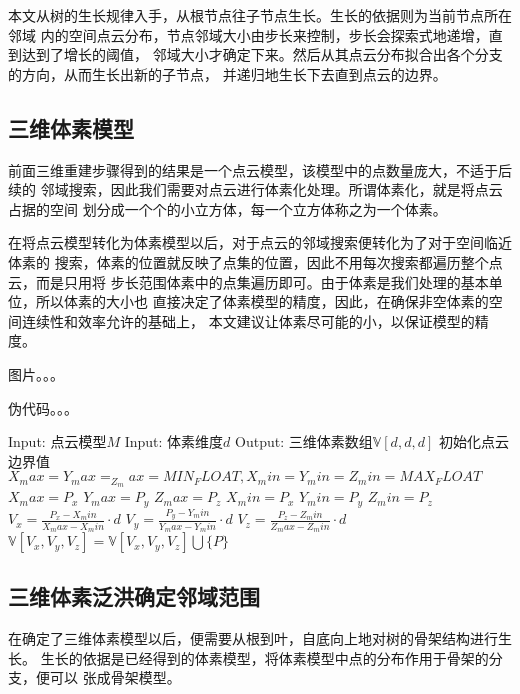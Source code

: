 本文从树的生长规律入手，从根节点往子节点生长。生长的依据则为当前节点所在邻域
内的空间点云分布，节点邻域大小由步长来控制，步长会探索式地递增，直到达到了增长的阈值，
邻域大小才确定下来。然后从其点云分布拟合出各个分支的方向，从而生长出新的子节点，
并递归地生长下去直到点云的边界。

\subsection{三维体素模型}
前面三维重建步骤得到的结果是一个点云模型，该模型中的点数量庞大，不适于后续的
邻域搜索，因此我们需要对点云进行体素化处理。所谓体素化，就是将点云占据的空间
划分成一个个的小立方体，每一个立方体称之为一个体素。

在将点云模型转化为体素模型以后，对于点云的邻域搜索便转化为了对于空间临近体素的
搜索，体素的位置就反映了点集的位置，因此不用每次搜索都遍历整个点云，而是只用将
步长范围体素中的点集遍历即可。由于体素是我们处理的基本单位，所以体素的大小也
直接决定了体素模型的精度，因此，在确保非空体素的空间连续性和效率允许的基础上，
本文建议让体素尽可能的小，以保证模型的精度。

图片。。。

伪代码。。。
\begin{algorithmic}[1]
	\State Input: 点云模型$M$
	\State Input: 体素维度$d$
	\State Output: 三维体素数组$\mathbb{V}[d,d,d]$
	\State 初始化点云边界值$X_max=Y_max=_Z_max=MIN_FLOAT,X_min=Y_min=Z_min=MAX_FLOAT$
		\State $X_max=P_x$
		\EndIf
		\State $Y_max=P_y$
		\EndIf
		\State $Z_max=P_z$
		\EndIf
		\State $X_min=P_x$
		\EndIf
		\State $Y_min=P_y$
		\EndIf
		\State $Z_min=P_z$
		\EndIf
	\EndFor
		\State $V_x = \frac{P_x-X_min}{X_max-X_min}\cdot d$
		\State $V_y = \frac{P_y-Y_min}{Y_max-Y_min}\cdot d$
		\State $V_z = \frac{P_z-Z_min}{Z_max-Z_min}\cdot d$
		\State $\mathbb{V}[V_x, V_y, V_z] = \mathbb{V}[V_x, V_y, V_z] \bigcup \{P\} $
	\EndFor
\end{algorithmic}

\subsection{三维体素泛洪确定邻域范围}
在确定了三维体素模型以后，便需要从根到叶，自底向上地对树的骨架结构进行生长。
生长的依据是已经得到的体素模型，将体素模型中点的分布作用于骨架的分支，便可以
张成骨架模型。

